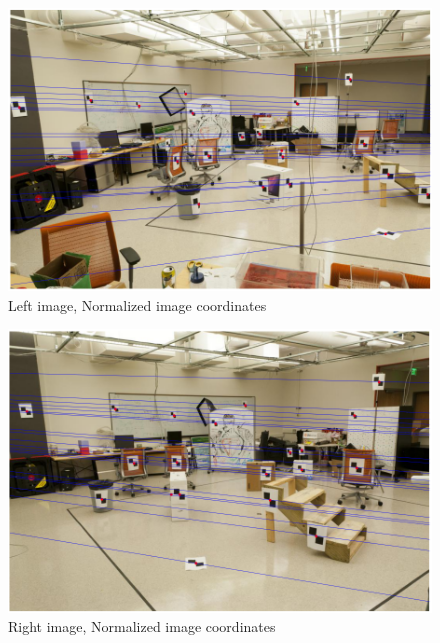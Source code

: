 \documentclass[11pt]{article}
\begin{document}
\begin{figure}[H]
    \centering
    \includegraphics[width=15cm]{images/part2/normalize_1_left.png}
    \caption{Left image, Normalized image coordinates}
\end{figure}

\begin{figure}[H]
    \centering
    \includegraphics[width=15cm]{images/part2/normalize_1_right.png}
    \caption{Right image, Normalized image coordinates}
\end{figure}
\end{document}
